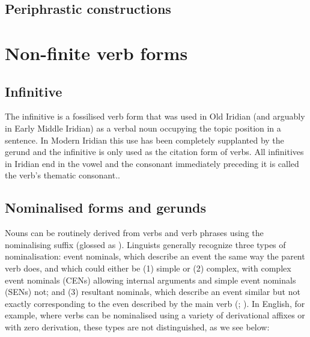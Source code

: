 \subsection{Periphrastic constructions}

\section{Non-finite verb forms}

\subsection{Infinitive}\label{sec:infinitive}

The {\sc infinitive} is a fossilised verb form that was used in Old Iridian (and arguably in Early Middle Iridian) as a verbal noun occupying the topic position in a sentence. In Modern Iridian this use has been completely supplanted by the gerund and the infinitive is only used as the citation form of verbs. All infinitives in Iridian end in the vowel  and the consonant immediately preceding it is called the verb's thematic consonant..

\subsection{Nominalised forms and gerunds}\label{nom-morph}

Nouns can be routinely derived from verbs and verb phrases using the nominalising suffix  (glossed as \Nz{}). Linguists generally recognize three types of nominalisation: event nominals, which describe an event the same way the parent verb does, and which could either be (1) simple or (2) complex, with {\sc complex event nominals} (CENs) allowing internal arguments and {\sc simple event nominals} (SENs) not; and (3) {\sc resultant nominals}, which describe an event similar but not exactly corresponding to the even described by the main verb (\cite{grimshaw1990}; \cite{moulton2014}). In English, for example, where verbs can be nominalised using a variety of derivational affixes or with zero derivation, these types are not distinguished, as we see below:

